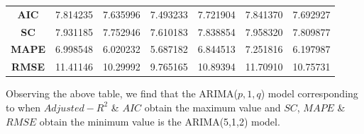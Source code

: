 \documentclass[12pt]{article}  %
\begin{document}
\begin{table}[!ht]
{\begin{tabular}{ccccccc}
\cellcolor[HTML]{D3EEDB}\textbf{AIC} &
  7.814235 &
  7.635996 &
  7.493233 &
  7.721904 &
  7.841370 &
  7.692927 \\
\rowcolor[HTML]{F5FCF7} 
\cellcolor[HTML]{D3EEDB}\textbf{SC} &
  7.931185 &
  7.752946 &
  7.610183 &
  7.838854 &
  7.958320 &
  7.809877 \\
\rowcolor[HTML]{F5FCF7} 
\cellcolor[HTML]{D3EEDB}\textbf{MAPE} &
  6.998548 &
  6.020232 &
  5.687182 &
  6.844513 &
  7.251816 &
  6.197987 \\
\rowcolor[HTML]{F5FCF7} 
\cellcolor[HTML]{D3EEDB}\textbf{RMSE} &
  11.41146 &
  10.29992 &
  9.765165 &
  10.89394 &
  11.70910 &
  10.75731 \\ \hline
\end{tabular}}
\end{table}

Observing the above table, we find that the ARIMA($p,1,q$) model corresponding to when $Adjusted-R^2$ \& $AIC$ obtain the maximum value and $SC$, $MAPE$ \& $RMSE$ obtain the minimum value is the ARIMA(5,1,2) model.
\end{document}
